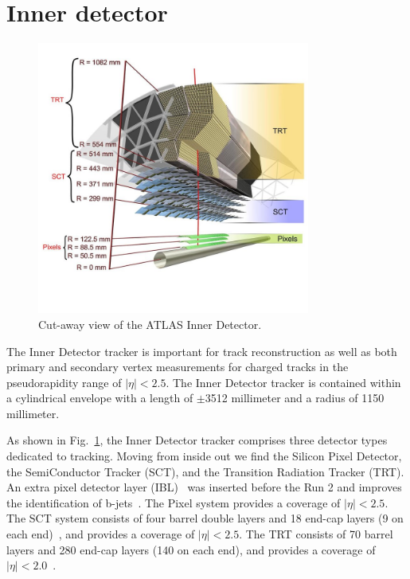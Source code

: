\section{Inner detector}
\label{sec:inner}

\begin{figure}[htbp]
    \centering
    \includegraphics[width=0.8\textwidth]{chapters/c4/figures/inner}
    \caption{Cut-away view of the ATLAS Inner Detector.}
    \label{fig:inner}
\end{figure}

\par The Inner Detector tracker is important for track reconstruction as well as both primary and secondary vertex measurements for charged tracks in the pseudorapidity range of $|\eta| < 2.5$. The Inner Detector tracker is contained within a cylindrical envelope with a length of $\pm$3512 millimeter and a radius of 1150 millimeter.

\par As shown in Fig.~\ref{fig:inner}, the Inner Detector tracker comprises three detector types dedicated to tracking. Moving from inside out we find the Silicon Pixel Detector, the SemiConductor Tracker (SCT), and the Transition Radiation Tracker (TRT). An extra pixel detector layer (IBL)~\cite{Capeans:1291633} was inserted before the Run 2 and improves the identification of b-jets~\cite{ATL-PHYS-PUB-2015-022}. The Pixel system provides a coverage of $|\eta| < 2.5$. The SCT system consists of four barrel double layers and 18 end-cap layers (9 on each end)~\cite{Aad:2014mta}, and provides a coverage of $|\eta| < 2.5$. The TRT consists of 70 barrel layers and 280 end-cap layers (140 on each end), and provides a coverage of $|\eta| < 2.0$~\cite{Aad:2014mta}.

